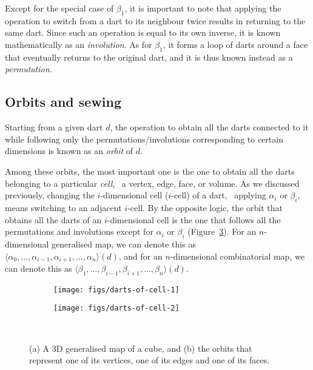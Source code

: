 Except for the special case of \(\beta_1\), it is important to note that applying the operation to switch from a dart to its neighbour twice results in returning to the same dart.
Since such an operation is equal to its own inverse, it is known mathematically as an \emph{involution}.
As for \(\beta_1\), it forms a loop of darts around a face that eventually returns to the original dart, and it is thus known instead as a \emph{permutation}.

\subsection{Orbits and sewing}

Starting from a given dart \(d\), the operation to obtain all the darts connected to it while following only the permutations/involutions corresponding to certain dimensions is known as an \emph{orbit} of \(d\).

Among these orbits, the most important one is the one to obtain all the darts belonging to a particular \emph{cell}, \ie\ a vertex, edge, face, or volume.
As we discussed previously, changing the \(i\)-dimensional cell (\(i\)-cell) of a dart, \ie\ applying \(\alpha_i\) or \(\beta_i\), means switching to an adjacent \(i\)-cell.
By the opposite logic, the orbit that obtains all the darts of an \(i\)-dimensional cell is the one that follows all the permutations and involutions except for \(\alpha_i\) or \(\beta_i\) (Figure~\ref{fig:darts-of-cell}).
For an \(n\)-dimensional generalised map, we can denote this as \(\langle \alpha_0, \ldots, \alpha_{i-1}, \alpha_{i+1}, \ldots, \alpha_n \rangle(d)\), and for an \(n\)-dimensional combinatorial map, we can denote this as \(\langle \beta_1, \ldots, \beta_{i-1}, \beta_{i+1}, \ldots, \beta_n \rangle(d)\).

\begin{figure}
\centering
\begin{subfigure}{0.4\linewidth}
\texttt{[image: figs/darts-of-cell-1]}
\caption{}%
\label{subfig:darts-of-cell-1}
\end{subfigure}%
\quad
\begin{subfigure}{0.4\linewidth}
\texttt{[image: figs/darts-of-cell-2]}
\caption{}%
\label{subfig:darts-of-cell-2}
\end{subfigure}\\
\caption{(a) A 3D generalised map of a cube, and (b) the orbits that represent one of its vertices, one of its edges and one of its faces.}%
\label{fig:darts-of-cell}
\end{figure}

